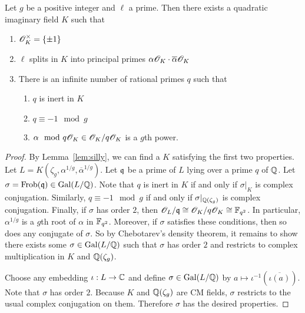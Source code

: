 \documentclass{amsart}
\begin{document}
\begin{lemma}\label{lem:K-exists}
  Let $g$ be a positive integer and $\ell$ a prime. Then there exists a quadratic imaginary field $K$ such that
  \begin{enumerate}
    \item $\mathscr{O}_K^\times = \{\pm 1\}$
    \item $\ell$ splits in $K$ into principal primes $\alpha\mathscr{O}_K \cdot \overline{\alpha}\mathscr{O}_K$
    \item There is an infinite number of rational primes $q$ such that
    \begin{enumerate}
      \item $q$ is inert in $K$
      \item $q \equiv -1 \mod{g}$
      \item $\alpha \mod q\mathscr{O}_K \in \mathscr{O}_K/q\mathscr{O}_K$ is a $g$th power.
    \end{enumerate}
  \end{enumerate}
\end{lemma}
\begin{proof}
  By Lemma~\ref{lem:silly}, we can find a $K$ satisfying the first two properties. Let $L = K(\zeta_g,\alpha^{1/g},\overline{\alpha}^{1/g})$. Let $\frak{q}$ be a prime of $L$ lying over a prime $q$ of $\mathbb{Q}$. Let $\sigma = \mathrm{Frob}(\frak{q}) \in \operatorname{Gal}(L/\mathbb{Q})$. Note that $q$ is inert in $K$ if and only if $\sigma|_K$ is complex conjugation. Similarly, $q \equiv -1 \mod{g}$ if and only if $\sigma|_{\mathbb{Q}(\zeta_g)}$ is complex conjugation.
Finally, if $\sigma$ has order $2$, then $\mathscr{O}_L/\frak{q} \cong \mathscr{O}_K/q\mathscr{O}_K \cong \mathbb{F}_{q^2}$. In particular, $\alpha^{1/g}$ is a $g$th root of $\alpha$ in $\mathbb{F}_{q^2}$. Moreover, if $\sigma$ satisfies these conditions, then so does any conjugate of $\sigma$. So by Chebotarev's density theorem, it remains to show there exists some $\sigma \in \operatorname{Gal}(L/\mathbb{Q})$ such that $\sigma$ has order $2$ and restricts to complex multiplication in $K$ and $\mathbb{Q}(\zeta_g)$.

  Choose any embedding $\iota: L \to \mathbb{C}$ and define $\sigma \in \operatorname{Gal}(L/\mathbb{Q})$ by $a \mapsto \iota^{-1}(\overline{\iota(a)})$. Note that $\sigma$ has order $2$. Because $K$ and $\mathbb{Q}(\zeta_g)$ are CM fields, $\sigma$ restricts to the usual complex conjugation on them. Therefore $\sigma$ has the desired properties.
\end{proof}
\end{document}
